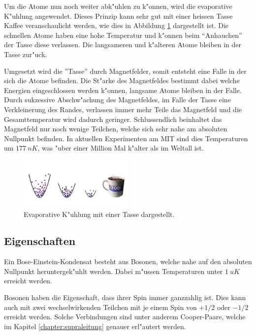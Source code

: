\begin{refsection}
Um die Atome nun noch weiter abk"uhlen zu k"onnen, wird die evaporative K"uhlung angewendet. Dieses Prinzip kann sehr gut mit einer heissen Tasse Kaffee veranschaulicht werden, wie dies in Abbildung \ref{fig:EvaporativeKuehlung} dargestellt ist. Die schnellen Atome haben eine hohe Temperatur und k"onnen beim ``Anhauchen'' der Tasse diese verlassen. Die langsameren und k"alteren Atome bleiben in der Tasse zur"uck.

Umgesetzt wird die ''Tasse'' durch Magnetfelder, somit entsteht eine Falle in der sich die Atome befinden. Die St"arke des Magnetfeldes bestimmt dabei welche Energien eingeschlossen werden k"onnen, langsame Atome bleiben in der Falle. Durch sukzessive Abschw"achung des Magnetfeldes, im Falle der Tasse eine Verkleinerung des Randes, verlassen immer mehr Teile das Magnetfeld und die Gesamttemperatur wird dadurch geringer. Schlussendlich beinhaltet das Magnetfeld nur noch wenige Teilchen, welche sich sehr nahe am absoluten Nullpunkt befinden. In aktuellen Experimenten am MIT sind dies Temperaturen um $177~nK$, was "uber einer Million Mal k"alter als im Weltall ist. \cite{bose:WikiEvaporativeKuehlung}

\begin{figure}
	\centering
	\includegraphics[width = 0.5\textwidth]{./bose/evaporation.png}
	\caption{Evaporative K"uhlung mit einer Tasse dargestellt.}
	\label{fig:EvaporativeKuehlung}
\end{figure}

\subsection{Eigenschaften}
Ein Bose-Einstein-Kondensat besteht aus Bosonen, welche nahe auf den absoluten Nullpunkt heruntergek"uhlt werden. Dabei m"ussen Temperaturen unter $1~uK$ erreicht werden.
 
Bosonen haben die Eigenschaft, dass ihrer Spin immer ganzzahlig ist. Dies kann auch mit zwei wechselwirkenden Teilchen mit je einem Spin von $+1/2$ oder $-1/2$ erreicht werden. Solche Verbindungen sind unter anderem Cooper-Paare, welche im Kapitel \ref{chapter:supraleitung} genauer erl"autert werden. 


\end{refsection}
